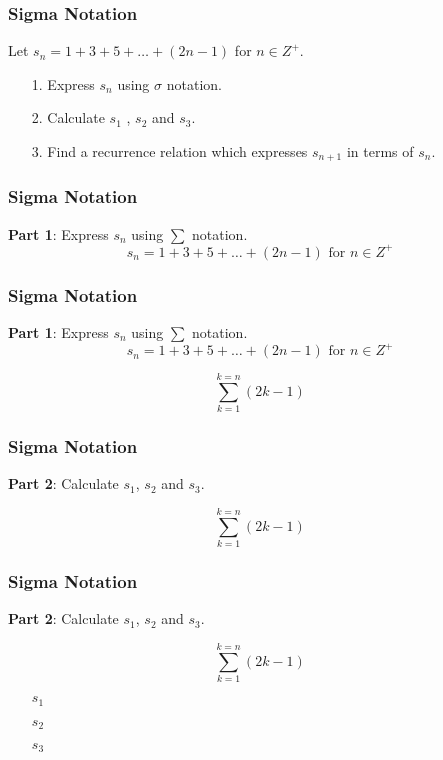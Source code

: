 \documentclass{beamer}
\begin{document}
\begin{frame}
\frametitle{Sigma Notation}
\Large
\vspace{-1cm}
Let $s_n = 1 + 3 + 5 + \ldots + (2n-1)$ for $n \in Z^{+}$.\\
\bigskip
\begin{itemize}
\item[1.] Express $s_n$ using $\sigma$ notation. \\
\bigskip
\item[2.] Calculate $s_1$ , $s_2$ and $s_3$. \\
\bigskip
\item[3.] Find a recurrence relation which expresses $s_{n+1}$ in terms of $s_n$.
\end{itemize}
\end{frame}
\begin{frame}
\frametitle{Sigma Notation}
\Large
\vspace{-2.3cm}
\textbf{Part 1}: Express $s_n$ using $\sum$ notation.
\[s_n = 1 + 3 + 5 + \ldots + (2n-1) \mbox{   for }n \in Z^{+}\]



\end{frame}
\begin{frame}
\frametitle{Sigma Notation}
\Large
\vspace{-1cm}
\textbf{Part 1}: Express $s_n$ using $\sum$ notation.
\[s_n = 1 + 3 + 5 + \ldots + (2n-1) \mbox{   for }n \in Z^{+}\]

{
\LARGE
\[  \sum^{k=n}_{k=1} (2k-1) \]
}
\end{frame}
\begin{frame}
\frametitle{Sigma Notation}
\Large
\vspace{-2.3cm}
\textbf{Part 2}: Calculate $s_1$, $s_2$ and $s_3$.

{
\LARGE
\[  \sum^{k=n}_{k=1} (2k-1) \]
}



\end{frame}
\begin{frame}
\frametitle{Sigma Notation}
\Large
\vspace{-2.3cm}
\textbf{Part 2}: Calculate $s_1$, $s_2$ and $s_3$.

{
\LARGE
\[  \sum^{k=n}_{k=1} (2k-1) \]
}

\begin{itemize}
\item[$s_1$]
\item[$s_2$]
\item[$s_3$]
\end{itemize}

\end{frame}
\end{document}
